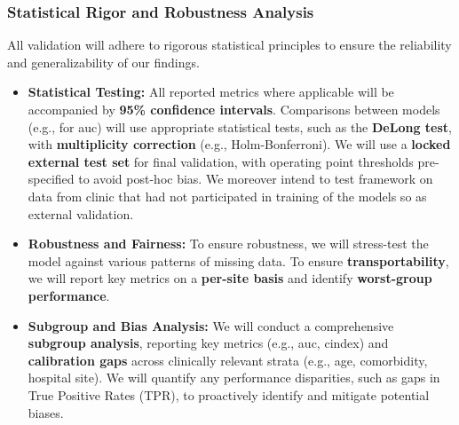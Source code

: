 \documentclass[11pt, a4paper]{article}
\begin{document}
\subsubsection{Statistical Rigor and Robustness Analysis}
All validation will adhere to rigorous statistical principles to ensure the reliability and generalizability of our findings.
\begin{itemize}
       \item \textbf{Statistical Testing:} All reported metrics where applicable will be accompanied by \textbf{95\% confidence intervals}. Comparisons between models (e.g., for \gls{auc}) will use appropriate statistical tests, such as the \textbf{DeLong test}, with \textbf{multiplicity correction} (e.g., Holm-Bonferroni). We will use a \textbf{locked external test set} for final validation, with operating point thresholds pre-specified to avoid post-hoc bias. We moreover intend to test framework on data from clinic that had not participated in training of the models so as external validation.
    
    \item \textbf{Robustness and Fairness:} To ensure robustness, we will stress-test the model against various patterns of missing data. To ensure \textbf{transportability}, we will report key metrics on a \textbf{per-site basis} and identify \textbf{worst-group performance}.
    
    \item \textbf{Subgroup and Bias Analysis:} We will conduct a comprehensive \textbf{subgroup analysis}, reporting key metrics (e.g., \gls{auc}, \gls{cindex}) and \textbf{calibration gaps} across clinically relevant strata (e.g., age, comorbidity, hospital site). We will quantify any performance disparities, such as gaps in True Positive Rates (TPR), to proactively identify and mitigate potential biases.
\end{itemize}
\end{document}
